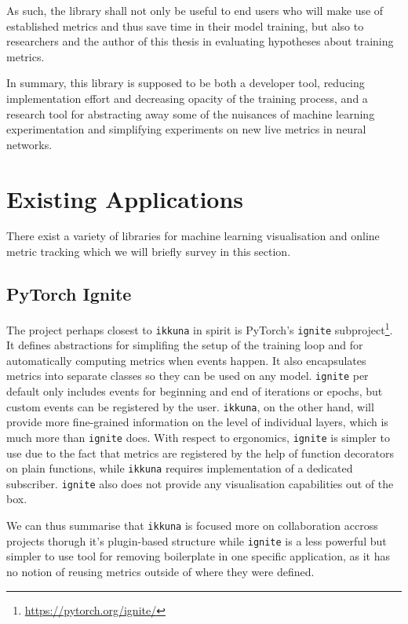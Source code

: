 As such, the library shall not only be useful to end users who will make use of
established metrics and thus save time in their model training, but also to
researchers and the author of this thesis in evaluating hypotheses about
training metrics.

In summary, this library is supposed to be both a developer tool, reducing
implementation effort and decreasing opacity of the training process, and a
research tool for abstracting away some of the nuisances of machine learning
experimentation and simplifying experiments on new live metrics in neural networks.

\hypertarget{sec:existing-apps}{%
\section{Existing Applications}\label{sec:existing-apps}}

There exist a variety of libraries for machine learning visualisation and online
metric tracking which we will briefly survey in this section.

\hypertarget{ignite}{%
\subsection*{PyTorch Ignite}\label{ignite}}

The project perhaps closest to \texttt{ikkuna} in spirit is PyTorch's
\texttt{ignite} subproject\footnote{\url{https://pytorch.org/ignite/}}. It
defines abstractions for simplifing the setup of the training loop and for
automatically computing metrics when events happen. It also encapsulates metrics
into separate classes so they can be used on any model.  \texttt{ignite} per
default only includes events for beginning and end of iterations or epochs, but
custom events can be registered by the user.  \texttt{ikkuna}, on the other
hand, will provide more fine-grained information on the level of individual
layers, which is much more than \texttt{ignite} does. With respect to
ergonomics, \texttt{ignite} is simpler to use due to the fact that metrics are
registered by the help of function decorators on plain functions, while
\texttt{ikkuna} requires implementation of a dedicated subscriber.
\texttt{ignite} also does not provide any visualisation capabilities out of the
box.

We can thus summarise that \texttt{ikkuna} is focused more on collaboration
accross projects thorugh it's plugin-based structure while \texttt{ignite} is a
less powerful but simpler to use tool for removing boilerplate in one specific
application, as it has no notion of reusing metrics outside of where they were
defined.

